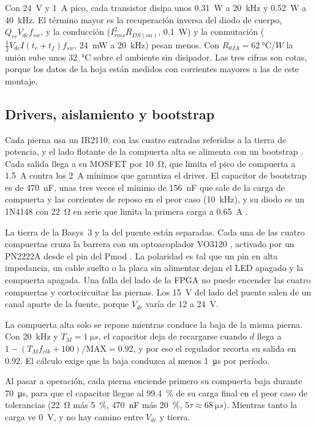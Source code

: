 \documentclass[journal]{IEEEtran}
\begin{document}
Con \SI{24}{V} y \SI{1}{A} pico, cada transistor disipa unos \SI{0.31}{W} a \SI{20}{kHz} y \SI{0.52}{W} a \SI{40}{kHz}. El término mayor es la recuperación inversa del diodo de cuerpo, $Q_{rr}V_{dc}f_{sw}$, y la conducción ($I_{rms}^2R_{DS(on)}$, \SI{0.1}{W}) y la conmutación ($\tfrac12V_{dc}I(t_r+t_f)f_{sw}$, \SI{24}{mW} a \SI{20}{kHz}) pesan menos. Con $R_{\theta JA}=\SI{62}{\celsius/W}$ la unión sube unos \SI{32}{\celsius} sobre el ambiente sin disipador. Las tres cifras son cotas, porque los datos de la hoja están medidos con corrientes mayores a las de este montaje.

\subsection{Drivers, aislamiento y bootstrap}
\label{sec:drivers}
Cada pierna usa un IR2110, con las cuatro entradas referidas a la tierra de potencia, y el lado flotante de la compuerta alta se alimenta con un bootstrap \cite{ir2110}. Cada salida llega a su MOSFET por \SI{10}{\ohm}, que limita el pico de compuerta a \SI{1.5}{A} contra los \SI{2}{A} mínimos que garantiza el driver. El capacitor de bootstrap es de \SI{470}{nF}, unas tres veces el mínimo de \SI{156}{nF} que sale de la carga de compuerta y las corrientes de reposo en el peor caso (\SI{10}{kHz}), y su diodo es un 1N4148 con \SI{22}{\ohm} en serie que limita la primera carga a \SI{0.65}{A} \cite{1n4148}.

La tierra de la Basys~3 y la del puente están separadas. Cada una de las cuatro compuertas cruza la barrera con un optoacoplador VO3120 \cite{vo3120}, activado por un PN2222A desde el pin del Pmod \cite{pn2222a}. La polaridad es tal que un pin en alta impedancia, un cable suelto o la placa sin alimentar dejan el LED apagado y la compuerta apagada. Una falla del lado de la FPGA no puede encender las cuatro compuertas y cortocircuitar las piernas. Los \SI{15}{V} del lado del puente salen de un canal aparte de la fuente, porque $V_{dc}$ varía de \num{12} a \SI{24}{V}.

La compuerta alta solo se repone mientras conduce la baja de la misma pierna. Con \SI{20}{kHz} y $T_M=\SI{1}{\micro s}$, el capacitor deja de recargarse cuando $d$ llega a $1-(T_M f_{clk}+100)/\mathrm{MAX}=\num{0.92}$, y por eso el regulador recorta su salida en $0.92$. El cálculo exige que la baja conduzca al menos \SI{1}{\micro s} por período.

Al pasar a operación, cada pierna enciende primero su compuerta baja durante \SI{70}{\micro s}, para que el capacitor llegue al \SI{99.4}{\percent} de su carga final en el peor caso de tolerancias (\SI{22}{\ohm} más \SI{5}{\percent}, \SI{470}{nF} más \SI{20}{\percent}, $5\tau\approx\SI{68}{\micro s}$). Mientras tanto la carga ve \SI{0}{V}, y no hay camino entre $V_{dc}$ y tierra.
\end{document}
